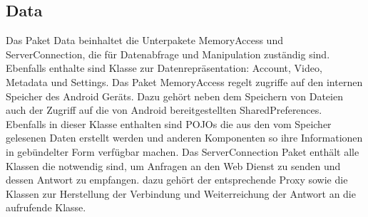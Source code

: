 \label{app:module:data}\subsection{Data}
Das Paket Data beinhaltet die Unterpakete MemoryAccess und ServerConnection, die für Datenabfrage und Manipulation zuständig sind. Ebenfalls enthalte sind Klasse zur Datenrepräsentation: Account, Video, Metadata und Settings.\newline
Das Paket MemoryAccess regelt zugriffe auf den internen Speicher des Android Geräts. Dazu gehört neben dem Speichern von Dateien auch der Zugriff auf die von Android bereitgestellten SharedPreferences. Ebenfalls in dieser Klasse enthalten sind POJOs die aus den vom Speicher gelesenen Daten erstellt werden und anderen Komponenten so ihre Informationen in gebündelter Form verfügbar machen.\newline
Das ServerConnection Paket enthält alle Klassen die notwendig sind, um Anfragen an den Web Dienst zu senden und dessen Antwort zu empfangen. dazu gehört der entsprechende Proxy sowie die Klassen zur Herstellung der Verbindung und Weiterreichung der Antwort an die aufrufende Klasse.